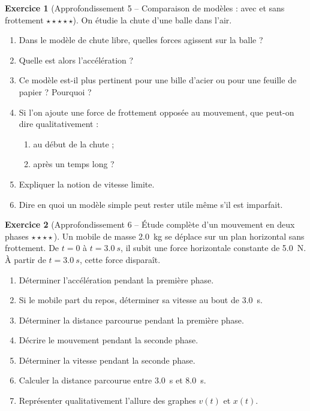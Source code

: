 \documentclass[11pt,a4paper]{article}
\theoremstyle{definition}
\newtheorem{exercice}{Exercice}[section]
\newcommand{\etoiles}[1]{\hfill{\small\textbf{#1}}}
\begin{document}
\begin{exercice}[Approfondissement 5 -- Comparaison de modèles : avec et sans frottement \etoiles{$\star\star\star\star\star$}]
On étudie la chute d’une balle dans l’air.

\begin{enumerate}[label=\arabic*.]
    \item Dans le modèle de chute libre, quelles forces agissent sur la balle ?
    \item Quelle est alors l’accélération ?
    \item Ce modèle est-il plus pertinent pour une bille d’acier ou pour une feuille de papier ? Pourquoi ?
    \item Si l’on ajoute une force de frottement opposée au mouvement, que peut-on dire qualitativement :
    \begin{enumerate}[label=\alph*)]
        \item au début de la chute ;
        \item après un temps long ?
    \end{enumerate}
    \item Expliquer la notion de vitesse limite.
    \item Dire en quoi un modèle simple peut rester utile même s’il est imparfait.
\end{enumerate}
\end{exercice}

\begin{exercice}[Approfondissement 6 -- Étude complète d’un mouvement en deux phases \etoiles{$\star\star\star\star$}]
Un mobile de masse \SI{2,0}{kg} se déplace sur un plan horizontal sans frottement.
De $t=0$ à $t=\SI{3,0}{s}$, il subit une force horizontale constante de \SI{5,0}{N}.
À partir de $t=\SI{3,0}{s}$, cette force disparaît.

\begin{enumerate}[label=\arabic*.]
    \item Déterminer l’accélération pendant la première phase.
    \item Si le mobile part du repos, déterminer sa vitesse au bout de \SI{3,0}{s}.
    \item Déterminer la distance parcourue pendant la première phase.
    \item Décrire le mouvement pendant la seconde phase.
    \item Déterminer la vitesse pendant la seconde phase.
    \item Calculer la distance parcourue entre \SI{3,0}{s} et \SI{8,0}{s}.
    \item Représenter qualitativement l’allure des graphes $v(t)$ et $x(t)$.
\end{enumerate}
\end{exercice}
\end{document}
